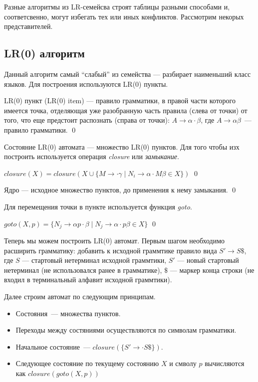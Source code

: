 Разные алгоритмы из LR-семейсва строят таблицы разными способами и, соответсвенно, могут избегать тех или иных конфликтов. Рассмотрим некорых представителей.

\subsection{LR(0) алгоритм}

Данный алгоритм самый ``слабый'' из семейства --- разбирает наименьший класс языков.
Для построения используются LR(0) пункты.

\begin{definition}
LR(0) пункт (LR(0) item) --- правило грамматики, в правой части которого имеется точка, отделяющая уже разобранную часть правила (слева от точки) от того, что еще предстоит распознать (справа от точки): $A \to \alpha \cdot \beta$, где $A \to \alpha \beta$~--- правило грамматики.
\qed
\end{definition}

Состояние LR(0) автомата --- множество LR(0) пунктов. Для того чтобы изх построить используется операция \textit{closure} или \textit{замыкание}.

\begin{definition}
$closure(X)  = closure(X \cup \{M \rightarrow \cdot \gamma \mid N_i \rightarrow \alpha\cdot M\beta \in X \})$
\qed
\end{definition}

\begin{definition}
Ядро --- исходное множество пунктов, до применения к нему замыкания.
\qed
\end{definition}

Для перемещения точки в пункте используется функция \textit{goto}.

\begin{definition}
$goto(X,p)  = \{N_j \rightarrow \alpha p \cdot \beta \mid N_j \rightarrow \alpha\cdot p\beta \in X \}$
\qed
\end{definition}

Теперь мы можем построить LR(0) автомат.
Первым шагом необходимо расширить грамматику: добавить к исходной граммтике правило вида $S' \to S \$$, где $S$ --- стартовый нетерминал исходной граммтики, $S'$ --- новый стартовый нетерминал (не использовался ранее в грамматике), $\$$ --- маркер конца строки (не входил в терминальный алфавит исходной граммтики).

Далее строим автомат по следующим принципам.

\begin{itemize}
    \item Состояния~--- множества пунктов.
    \item Переходы между состяниями осуществляются по символам грамматики.
    \item Начальное состояние~--- $closure(\{S'\to
    \cdot S \$\})$.
    \item Следующее состояние по текущему состоянию $X$ и смволу $p$ вычисляются как $closure(goto(X, p))$
  \end{itemize}

